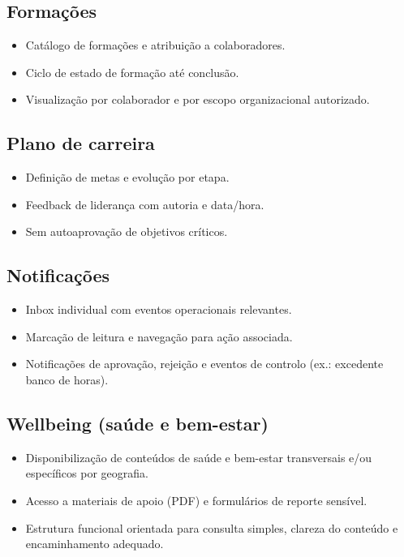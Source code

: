 \documentclass[11pt,a4paper,twoside]{article}
\begin{document}
\subsection{Formações}
\begin{itemize}
  \item Catálogo de formações e atribuição a colaboradores.
  \item Ciclo de estado de formação até conclusão.
  \item Visualização por colaborador e por escopo organizacional autorizado.
\end{itemize}

\subsection{Plano de carreira}
\begin{itemize}
  \item Definição de metas e evolução por etapa.
  \item Feedback de liderança com autoria e data/hora.
  \item Sem autoaprovação de objetivos críticos.
\end{itemize}

\subsection{Notificações}
\begin{itemize}
  \item Inbox individual com eventos operacionais relevantes.
  \item Marcação de leitura e navegação para ação associada.
  \item Notificações de aprovação, rejeição e eventos de controlo (ex.: excedente banco de horas).
\end{itemize}

\subsection{Wellbeing (saúde e bem-estar)}
\begin{itemize}
  \item Disponibilização de conteúdos de saúde e bem-estar transversais e/ou específicos por geografia.
  \item Acesso a materiais de apoio (PDF) e formulários de reporte sensível.
  \item Estrutura funcional orientada para consulta simples, clareza do conteúdo e encaminhamento adequado.
\end{itemize}
\end{document}

